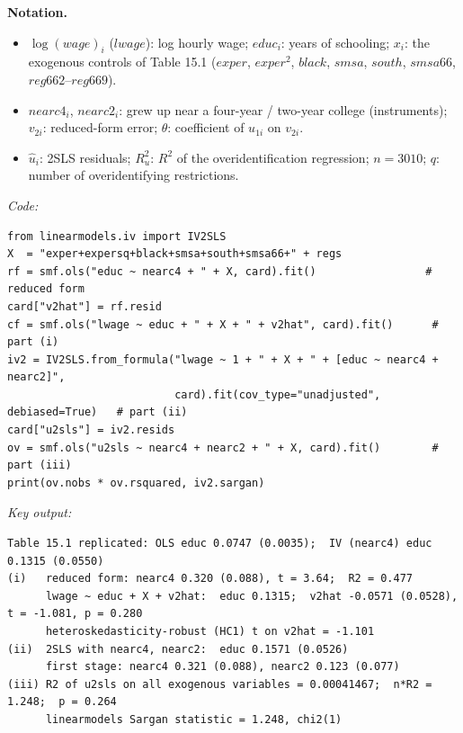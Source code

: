 \documentclass[11pt,a4paper]{article}
\newenvironment{notacao}{\par\smallskip\noindent\textbf{Notation.}\begin{itemize}[leftmargin=1.4em,topsep=1pt,itemsep=0pt]\small}{\end{itemize}}
\begin{document}
\begin{sol}
\begin{notacao}
\item $\log(wage)_i$ ($lwage$): log hourly wage; $educ_i$: years of schooling; $x_i$: the exogenous
controls of Table 15.1 ($exper$, $exper^2$, $black$, $smsa$, $south$, $smsa66$, $reg662$--$reg669$).
\item $nearc4_i$, $nearc2_i$: grew up near a four-year / two-year college (instruments); $v_{2i}$:
reduced-form error; $\theta$: coefficient of $u_{1i}$ on $v_{2i}$.
\item $\hat u_i$: 2SLS residuals; $R^2_u$: $R^2$ of the overidentification regression; $n=3010$; $q$:
number of overidentifying restrictions.
\end{notacao}

\noindent\textit{Code:}
\begingroup\footnotesize
\begin{verbatim}
from linearmodels.iv import IV2SLS
X  = "exper+expersq+black+smsa+south+smsa66+" + regs
rf = smf.ols("educ ~ nearc4 + " + X, card).fit()                 # reduced form
card["v2hat"] = rf.resid
cf = smf.ols("lwage ~ educ + " + X + " + v2hat", card).fit()      # part (i)
iv2 = IV2SLS.from_formula("lwage ~ 1 + " + X + " + [educ ~ nearc4 + nearc2]",
                          card).fit(cov_type="unadjusted", debiased=True)   # part (ii)
card["u2sls"] = iv2.resids
ov = smf.ols("u2sls ~ nearc4 + nearc2 + " + X, card).fit()        # part (iii)
print(ov.nobs * ov.rsquared, iv2.sargan)
\end{verbatim}
\endgroup
\noindent\textit{Key output:}
\begingroup\footnotesize
\begin{verbatim}
Table 15.1 replicated: OLS educ 0.0747 (0.0035);  IV (nearc4) educ 0.1315 (0.0550)
(i)   reduced form: nearc4 0.320 (0.088), t = 3.64;  R2 = 0.477
      lwage ~ educ + X + v2hat:  educ 0.1315;  v2hat -0.0571 (0.0528), t = -1.081, p = 0.280
      heteroskedasticity-robust (HC1) t on v2hat = -1.101
(ii)  2SLS with nearc4, nearc2:  educ 0.1571 (0.0526)
      first stage: nearc4 0.321 (0.088), nearc2 0.123 (0.077)
(iii) R2 of u2sls on all exogenous variables = 0.00041467;  n*R2 = 1.248;  p = 0.264
      linearmodels Sargan statistic = 1.248, chi2(1)
\end{verbatim}
\endgroup


\end{sol}
\end{document}

